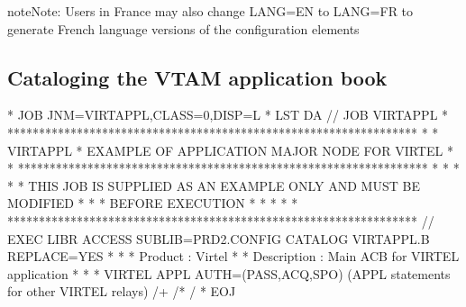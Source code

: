 \documentclass[letterpaper,10pt,english]{sphinxmanual}
\begin{document}
\begin{sphinxadmonition}{note}{Note:}
\sphinxAtStartPar
Users in France may also change LANG=EN to LANG=FR to generate French language versions of the configuration elements
\end{sphinxadmonition}


\subsection{Cataloging the VTAM application book}
\label{\detokenize{Installation_Guide:cataloging-the-vtam-application-book}}
\begin{sphinxVerbatim}[commandchars=\\\{\}]
* \PYGZdl{}\PYGZdl{} JOB JNM=VIRTAPPL,CLASS=0,DISP=L
* \PYGZdl{}\PYGZdl{} LST DA
// JOB VIRTAPPL
* *****************************************************************
* * VIRTAPPL * EXAMPLE OF APPLICATION MAJOR NODE FOR VIRTEL *
* *****************************************************************
* * *
* * THIS JOB IS SUPPLIED AS AN EXAMPLE ONLY AND MUST BE MODIFIED *
* * BEFORE EXECUTION *
* * *
* *****************************************************************
// EXEC LIBR
ACCESS SUBLIB=PRD2.CONFIG
CATALOG VIRTAPPL.B REPLACE=YES
* \PYGZhy{}\PYGZhy{}\PYGZhy{}\PYGZhy{}\PYGZhy{}\PYGZhy{}\PYGZhy{}\PYGZhy{}\PYGZhy{}\PYGZhy{}\PYGZhy{}\PYGZhy{}\PYGZhy{}\PYGZhy{}\PYGZhy{}\PYGZhy{}\PYGZhy{}\PYGZhy{}\PYGZhy{}\PYGZhy{}\PYGZhy{}\PYGZhy{}\PYGZhy{}\PYGZhy{}\PYGZhy{}\PYGZhy{}\PYGZhy{}\PYGZhy{}\PYGZhy{}\PYGZhy{}\PYGZhy{}\PYGZhy{}\PYGZhy{}\PYGZhy{}\PYGZhy{}\PYGZhy{}\PYGZhy{}\PYGZhy{}\PYGZhy{}\PYGZhy{}\PYGZhy{}\PYGZhy{}\PYGZhy{}\PYGZhy{}\PYGZhy{}\PYGZhy{}\PYGZhy{}\PYGZhy{}\PYGZhy{}\PYGZhy{}\PYGZhy{}\PYGZhy{}\PYGZhy{}\PYGZhy{}\PYGZhy{}\PYGZhy{}\PYGZhy{}\PYGZhy{}\PYGZhy{}\PYGZhy{}\PYGZhy{}\PYGZhy{}\PYGZhy{}\PYGZhy{}\PYGZhy{}\PYGZhy{} *
* Product : Virtel *
* Description : Main ACB for VIRTEL application *
* \PYGZhy{}\PYGZhy{}\PYGZhy{}\PYGZhy{}\PYGZhy{}\PYGZhy{}\PYGZhy{}\PYGZhy{}\PYGZhy{}\PYGZhy{}\PYGZhy{}\PYGZhy{}\PYGZhy{}\PYGZhy{}\PYGZhy{}\PYGZhy{}\PYGZhy{}\PYGZhy{}\PYGZhy{}\PYGZhy{}\PYGZhy{}\PYGZhy{}\PYGZhy{}\PYGZhy{}\PYGZhy{}\PYGZhy{}\PYGZhy{}\PYGZhy{}\PYGZhy{}\PYGZhy{}\PYGZhy{}\PYGZhy{}\PYGZhy{}\PYGZhy{}\PYGZhy{}\PYGZhy{}\PYGZhy{}\PYGZhy{}\PYGZhy{}\PYGZhy{}\PYGZhy{}\PYGZhy{}\PYGZhy{}\PYGZhy{}\PYGZhy{}\PYGZhy{}\PYGZhy{}\PYGZhy{}\PYGZhy{}\PYGZhy{}\PYGZhy{}\PYGZhy{}\PYGZhy{}\PYGZhy{}\PYGZhy{}\PYGZhy{}\PYGZhy{}\PYGZhy{}\PYGZhy{}\PYGZhy{}\PYGZhy{}\PYGZhy{}\PYGZhy{}\PYGZhy{}\PYGZhy{}\PYGZhy{} *
VIRTEL APPL AUTH=(PASS,ACQ,SPO)
  (APPL statements for other VIRTEL relays)
/+
/*
/\PYGZam{}
* \PYGZdl{}\PYGZdl{} EOJ
\end{sphinxVerbatim}
\end{document}
